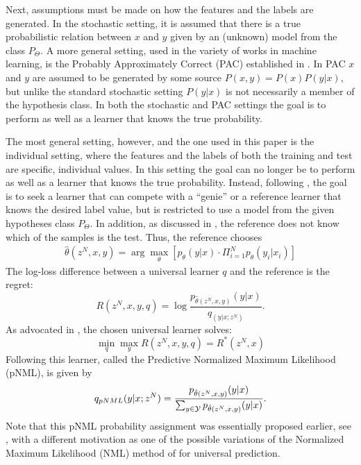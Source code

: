 \documentclass[conference,letterpaper]{IEEEtran}
\def\pNMLSingle{p_{\hat{\theta}(z^N,x,y)} (y|x)}
\begin{document}
Next, assumptions must be made on how the features and the labels are generated. 
In the stochastic setting, it is assumed that there is a true probabilistic relation between $x$ and $y$ given by an (unknown) model from the class $P_\Theta$. 
A more general setting, used in the variety of works in machine learning, is the Probably Approximately Correct (PAC) established in  \cite{valiant1984theory}. 
In PAC $x$ and $y$ are assumed to be generated by some source $P(x,y)=P(x)P(y|x)$, but unlike the standard stochastic setting $P(y|x)$ is not necessarily a member of the hypothesis class. 
In both the stochastic and PAC settings the goal is to perform as well as a learner that knows the true probability.

The most general setting, however, and the one used in this paper is 
the individual setting, where the features and the labels of both the training and test are specific, individual values.
In this setting the goal can no longer be to perform as well as a learner that knows the true probability. Instead, following \cite{universal_prediction}, the goal is to seek a learner that can compete with a ``genie'' or a reference learner that knows the desired label value, but is restricted to use a model from the given hypotheses class $P_\Theta$. In addition, as discussed in \cite{FogelFeder2018}, the reference does not know which of the samples is the test. Thus, the reference chooses
\begin{align} \hat{\theta}(z^N,x,y)  = \arg\max_\theta \left[ p_\theta(y|x) \cdot\Pi_{i=1}^N p_\theta(y_i|x_i) \right] \end{align}
The log-loss difference between a universal learner $q$ and the reference is the regret:
\begin{equation} \label{eq:genie_regret}
R(z^N,x,y,q) = \log \frac{p_{\hat{\theta}(z^N,x,y)}(y|x)}{q_(y|x;z^N)}.
\end{equation}
As advocated in \cite{FogelFeder2018}, the chosen universal learner solves:
\begin{equation} \label{eq:minmax_prob}
\min_q \max_y R(z^N,x,y,q) = R^*(z^N,x)
\end{equation}
Following \cite{shtar1987universal} this learner, called the Predictive Normalized Maximum Likelihood (pNML), is given by
\begin{equation} \label{eq:pNML}
q_{\mbox{\tiny{pNML}}}(y|x;z^N)=\frac{\pNMLSingle}{\sum_{y\in {\cal Y}} \pNMLSingle}.
\end{equation}
Note that this pNML probability assignment was essentially proposed earlier, see \cite{roos2008sequentially,roos2008bayesian}, with a different motivation as one of the possible variations of the Normalized Maximum Likelihood (NML) method of \cite{shtar1987universal} for universal prediction.
\end{document}

